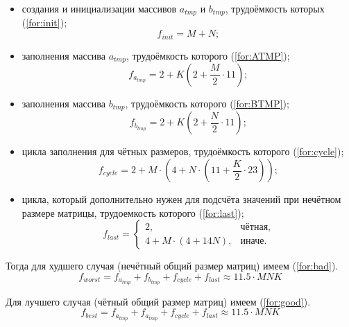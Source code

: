 \begin{itemize}[label=---]
	\item создания и инициализации массивов $a_{tmp}$ и $b_{tmp}$, трудоёмкость которых (\ref{for:init});
	\begin{equation}
		\label{for:init}
		f_{init} = M + N;
	\end{equation}

	\item заполнения массива $a_{tmp}$, трудоёмкость которого (\ref{for:ATMP});
	\begin{equation}
		\label{for:ATMP}
		f_{a_{tmp}} = 2 + K (2 + \frac{M}{2} \cdot 11);
	\end{equation}

	\item заполнения массива $b_{tmp}$, трудоёмкость которого (\ref{for:BTMP});
	\begin{equation}
		\label{for:BTMP}
		f_{b_{tmp}} = 2 + K (2 + \frac{N}{2} \cdot 11);
	\end{equation}

	\item цикла заполнения для чётных размеров, трудоёмкость которого (\ref{for:cycle});
	\begin{equation}
		\label{for:cycle}
		f_{cycle} = 2 + M \cdot (4 + N \cdot (11 + \frac{K}{2} \cdot 23));
	\end{equation}

	\item цикла, который дополнительно нужен для подсчёта значений при нечётном размере матрицы, трудоемкость которого (\ref{for:last});
	\begin{equation}
		\label{for:last}
		f_{last} = \begin{cases}
			2, & \text{чётная,}\\
			4 + M \cdot (4 + 14N), & \text{иначе.}
		\end{cases}
	\end{equation}
\end{itemize}

Тогда для худшего случая (нечётный общий размер матриц) имеем (\ref{for:bad}).
\begin{equation}
	\label{for:bad}
	f_{worst} =  f_{a_{tmp}} + f_{b_{tmp}} + f_{cycle} + f_{last}\approx 11.5 \cdot MNK
\end{equation}

Для лучшего случая (чётный общий размер матриц) имеем (\ref{for:good}).
\begin{equation}
	\label{for:good}
f_{best} =  f_{a_{tmp}} + f_{a_{tmp}} + f_{cycle} + f_{last} \approx 11.5 \cdot MNK
\end{equation}


